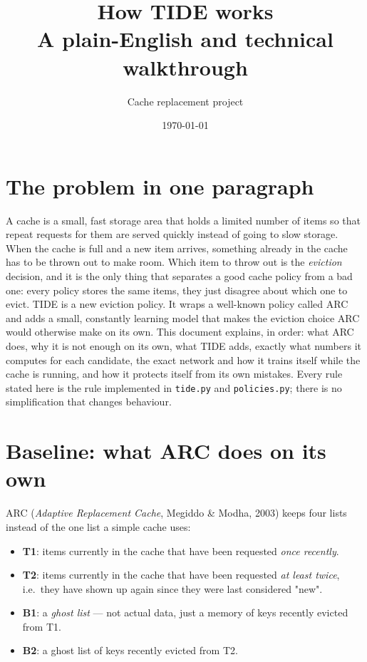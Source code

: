 \documentclass[10pt,a4paper]{article}
\title{How TIDE works\\\Large A plain-English and technical walkthrough}
\author{Cache replacement project}
\date{\today}
\newcommand{\code}[1]{\texttt{#1}}
\begin{document}
\maketitle
\tableofcontents

\section{The problem in one paragraph}
A cache is a small, fast storage area that holds a limited number of items so that repeat requests for
them are served quickly instead of going to slow storage. When the cache is full and a new item arrives,
something already in the cache has to be thrown out to make room. Which item to throw out is the
\emph{eviction} decision, and it is the only thing that separates a good cache policy from a bad one:
every policy stores the same items, they just disagree about which one to evict. TIDE is a new eviction
policy. It wraps a well-known policy called ARC and adds a small, constantly learning model that makes
the eviction choice ARC would otherwise make on its own. This document explains, in order: what ARC
does, why it is not enough on its own, what TIDE adds, exactly what numbers it computes for each
candidate, the exact network and how it trains itself while the cache is running, and how it protects
itself from its own mistakes. Every rule stated here is the rule implemented in \code{tide.py} and
\code{policies.py}; there is no simplification that changes behaviour.

\section{Baseline: what ARC does on its own}
ARC (\emph{Adaptive Replacement Cache}, Megiddo \& Modha, 2003) keeps four lists instead of the one list a
simple cache uses:

\begin{itemize}
  \item \textbf{T1}: items currently in the cache that have been requested \emph{once recently}.
  \item \textbf{T2}: items currently in the cache that have been requested \emph{at least twice}, i.e.\ they
        have shown up again since they were last considered "new".
  \item \textbf{B1}: a \emph{ghost list} — not actual data, just a memory of keys recently evicted from T1.
  \item \textbf{B2}: a ghost list of keys recently evicted from T2.
\end{itemize}
\end{document}
